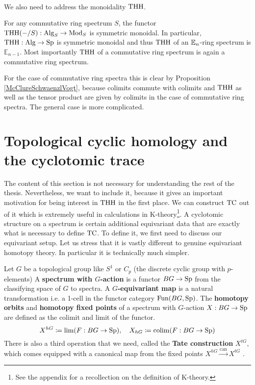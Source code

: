\\
We also need to address the monoidality $\operatorname{THH}$.
\begin{prop}\label{THHmonoidal}
    For any commutative ring spectrum $S$, the functor \\ $\operatorname{THH}(-/S): \operatorname{Alg}_S\rightarrow \operatorname{Mod}_S$ is symmetric monoidal. In particular, $\operatorname{THH}:\operatorname{Alg}\to \operatorname{Sp}$ is symmetric monoidal and thus $\operatorname{THH}$ of an $\mathbb{E}_n$-ring spectrum is $\mathbb{E}_{n-1}$. Most importantly $\operatorname{THH}$ of a commutative ring spectrum is again a commutative ring spectrum.
\end{prop}
For the case of commutative ring spectra this is clear by Proposition \ref{McClureSchwaenzlVogt}, because colimits commute with colimits and $\operatorname{THH}$ as well as the tensor product are given by colimits in the case of commutative ring spectra. The general case is more complicated.

\section{Topological cyclic homology and the cyclotomic trace} \label{TC}
The content of this section is not necessary for understanding the rest of the thesis. Nevertheless, we want to include it, because it gives an important motivation for being interest in $\operatorname{THH}$ in the first place. We can construct $\operatorname{TC}$ out of it which is extremely useful in calculations in K-theory\footnote{See the appendix for a recollection on the definition of K-theory.}. 
A cyclotomic structure on a spectrum is certain additional equivariant data that are exactly what is necessary to define $\operatorname{TC}$.
To define it, we first need to discuss our equivariant setup. Let us stress that it is vastly different to genuine equivariant homotopy theory. In particular it is technically much simpler.
\begin{defn}
    Let $G$ be a topological group like $S^1$ or $C_p$ (the discrete cyclic group with $p$-elements) 
    A \textbf{spectrum with $G$-action} is a functor $BG\to \operatorname{Sp}$ from the classifying space of $G$ to spectra. A \textbf{$G$-equivariant map} is a natural transformation i.e. a 1-cell in the functor category $\operatorname{Fun}(BG,\operatorname{Sp})$. The \textbf{homotopy orbits} and \textbf{homotopy fixed points} of a spectrum with $G$-action $X:BG\to \operatorname{Sp}$ are defined as the colimit and limit of the functor.
    \begin{equation*}
        X^{hG}\coloneqq \lim(F:BG\to \operatorname{Sp}),\quad X_{hG}\coloneqq \operatorname{colim}(F:BG\to \operatorname{Sp})
    \end{equation*}
    There is also a third operation that we need, called the \textbf{Tate construction} $X^{tG}$, which comes equipped with a canonical map from the fixed points $X^{hG}\xrightarrow{\mathrm{can}}X^{tG}$ . 
\end{defn}

